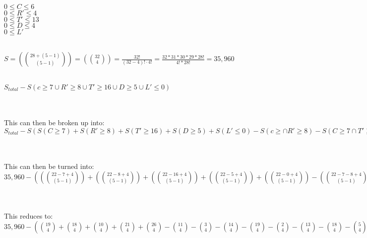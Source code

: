 \documentclass{article}
\begin{document}
\begin{problem}
\begin{solution}
\\ $0 \le C \le 6$
\\ $0 \le R' \le 4$
\\ $0 \le T' \le 13$
\\ $0 \le D \le 4$
\\ $0 \le L'$
\newline

\\ $S = ({28+(5-1) \choose (5-1)}) = ({32 \choose 4}) = \frac{32!}{(32-4)! \cdot 4!} = \frac{32*31*30*29*28!}{4!*28!} = 35,960$
\newline

\\ $S_{total} - S(c\ge7 \cup R' \ge 8 \cup T' \ge 16 \cup D \ge 5 \cup L' \le 0)$
\newline

\\\\ This can then be broken up into:
\\ $S_{total}-S(S(C \ge 7)+S(R' \ge 8)+S(T' \ge 16)+S(D \ge 5)+S(L' \le 0) -S(c \ge \cap R' \ge 8)- S(C \ge 7 \cap T' \ge 16)- S(C \ge 7 \cap D \ge 5)- S(C \ge 7 \cap L' \le 0)- S(R' \ge 8 \cap T' \ge 16)- S(R' \ge 8 \cap D \ge 5)- S(R' \ge 8 \cap L' \le 0)- S(T' \ge 16 \cap D \ge 5)- S(T' \ge 16 \cap L' \le 0)- S(D \ge 5 \cap L' \le 0) + S(c \ge 7 \cap R' \ge 8 \cap T' \ge 16 \cap d \ge 5 \cap L' \le 0))$
\newline

\\\\ This can then be turned into:
\\ $35,960 - (({22-7+4 \choose (5-1)}) + ({22-8+4 \choose (5-1)}) + ({22-16+4 \choose (5-1)}) + ({22-5+4 \choose (5-1)}) + ({22-0+4 \choose (5-1)}) - ({22-7-8+4 \choose (5-1)}) - ({22-7-16+4 \choose (5-1)}) - ({22-7-5+4 \choose (5-1)}) + ({22-7-0+4 \choose (5-1)}) - ({22-8-16+4 \choose (5-1)}) - ({22-8-5+4 \choose (5-1)}) - ({22-8-0+4 \choose (5-1)}) ({22-16-5+4 \choose (5-1)}) - ({22-16-0+4 \choose (5-1)}) - ({22-5-0+4 \choose (5-1)}) + ({22-8-5-16-7-0+4 \choose (5-1)}))$
\newline

\\\\ This reduces to:
\\ $35,960 - ( {19 \choose 4} + {18 \choose 4} + {10 \choose 4} + {21 \choose 4} + {26 \choose 4} - {11 \choose 4} - {3 \choose 4} - {14 \choose 4} - {19 \choose 4} - {2 \choose 4} - {13 \choose 4} - {18 \choose 4} - {5 \choose 4} - {10 \choose 4} - {21 \choose 4} + {0 \choose 4} )$
\newline


\end{solution}
\end{problem}
\end{document}
